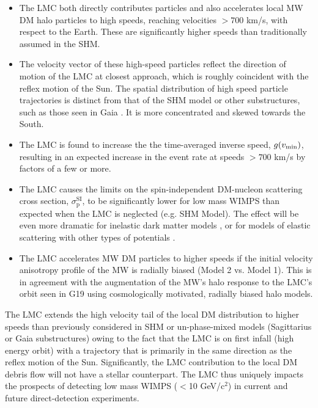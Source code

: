 \documentclass[letterpaper,11pt]{article}
\newcommand{\sigmapsi}{$\sigma_{\mathrm{p}}^{\mathrm{SI}}$}
\begin{document}
\begin{itemize}
\item The LMC both directly contributes particles and also 
accelerates local MW DM halo particles to high speeds, reaching velocities 
$>700$ km/s, with respect to the Earth.  These are significantly higher speeds 
than traditionally assumed in the SHM.  

\item The velocity vector of these high-speed particles reflect 
 the direction of motion of the LMC at closest approach, which is roughly coincident with the reflex motion of the Sun. The spatial distribution of high speed particle trajectories
 is distinct from that of the SHM model or other substructures, such as those seen in Gaia \citep{Evans:2019bqy}. It is more concentrated and skewed towards the South.


\item The LMC is found to increase the 
the time-averaged inverse speed, $g(v_{\rm min})$, resulting in 
an expected increase in the event rate at speeds $>700$ km/s by factors of a few or more.  

\item The LMC causes the limits on the spin-independent
DM-nucleon scattering cross section, \sigmapsi,
to be significantly lower for low mass WIMPS than expected 
when the LMC is neglected (e.g. SHM Model). The effect will be even more dramatic for inelastic dark matter models \cite{smith2001,Kuhlen:2010}, or for models of elastic scattering with other types of potentials \cite{fan2010,fitzpatrick2013}.

\item The LMC accelerates MW DM particles to higher speeds if the initial
velocity anisotropy profile of the MW is radially biased (Model 2 vs. Model 1).
This is in agreement with the augmentation of the MW's halo response to the LMC's orbit seen 
in G19 using cosmologically motivated, radially biased halo models.



\end{itemize}


The LMC extends the high velocity tail of the local DM distribution to higher speeds than previously considered in SHM or un-phase-mixed models (Sagittarius or Gaia substructures) owing to the fact that the LMC is on first infall (high energy orbit) with a trajectory that is 
primarily in the same direction as the reflex motion of the Sun. 
Significantly, the LMC contribution to the local DM debris flow will not have a stellar
counterpart. 
The LMC thus 
uniquely impacts the prospects of detecting low mass WIMPS ($<$10 GeV/c$^2$) in current and future 
direct-detection experiments.
\end{document}
